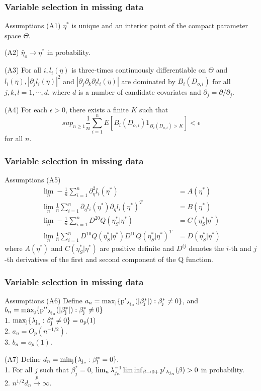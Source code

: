\documentclass{beamer}
\begin{document}
\begin{frame}
\frametitle{Variable selection in missing data}
\begin{block}{Assumptions}
(A1) $\eta^*$ is unique and an interior point of the compact parameter space $\Theta$.

(A2) $\hat{\eta}_o \to \eta^*$  in probability.

(A3) For all $i, l_i (\eta)$ is three-times continuously differentiable on $\Theta$ and $l_i(\eta), |\partial_j l_i(\eta) | ^2$ and $|\partial_j \partial_k \partial_l l_i(\eta) | $ are dominated by $B_i (D_{o,i})$ for all $j,k,l = 1, \cdots, d$. where $d$ is a number of candidate covariates and $\partial_j = \partial / \partial_j$.

(A4) For each $\epsilon >0 $, there exists a finite $K$ such that
$$
sup_{n \geq1} \frac{1}{n} \sum_{i=1} ^n E [ B_i(D_{o,i}) 1_{B_i(D_{o,i})>K}]  < \epsilon
$$
for all $n$.
\end{block}
\end{frame}
\begin{frame}
\frametitle{Variable selection in missing data}
\begin{block}{Assumptions}
(A5) \begin{align*}
\lim_{n} -\frac{1}{n} \sum_{i=1} ^n \partial _\eta ^2 l_i(\eta^*) &= A(\eta^*) \\
\lim_{n} \frac{1}{n} \sum_{i=1} ^n \partial _\eta  l_i(\eta^*) \partial _\eta l_i(\eta^*)^T &= B(\eta^*)\\
\lim_{n} -\frac{1}{n} \sum_{i=1} ^n D^{20}Q(\eta_S ^* | \eta^*) &= C(\eta_S ^* | \eta^*)\\
\lim_{n} \frac{1}{n} \sum_{i=1} ^n D^{10}Q(\eta_S ^* | \eta^*) D^{10}Q(\eta_S ^* | \eta^*)^T &= D(\eta_S ^* | \eta^*)
\end{align*}
where $A(\eta^*)$ and $C(\eta_S ^* | \eta^*)$ are positive definite and $D^{ij}$ denotes the $i$-th and $j$-th derivatives of the first and second component of the Q function.
\end{block}
\end{frame}
\begin{frame}
\frametitle{Variable selection in missing data}
\begin{block}{Assumptions}
(A6) Define $a_n = \rm{max}_j \{ p\rq{} _{\lambda_{j_n}} (| \beta^* _j |) : \beta^* _j  \neq 0\}$, and $b_n = \rm{max}_j \{ p\rq{}\rq{} _{\lambda_{j_n}} (| \beta^* _j |) : \beta^* _j  \neq 0\}$\\
1. $\rm{max}_j \{ \lambda_{j_n} :  \beta^* _j  \neq 0\} = o_p (1)$ \\
2. $a_n = O_p (n^{-1/2})$.\\
3. $b_n = o_p (1)$.

(A7) Define $d_n = \rm{min}_j \{ \lambda_{j_n} :  \beta^* _j  = 0\}.$\\
1. For all $j$ such that $\beta_j ^* = 0$, $\lim _n \lambda_{j_n} ^{-1} \liminf _{\beta \to 0+} p\rq{} _{ \lambda_{j_n}} (\beta) >0 $ in probability.\\
2. $ n^{1/2}d_n \overset{p}\to \infty $. 

\end{block}
\end{frame}
\end{document}
